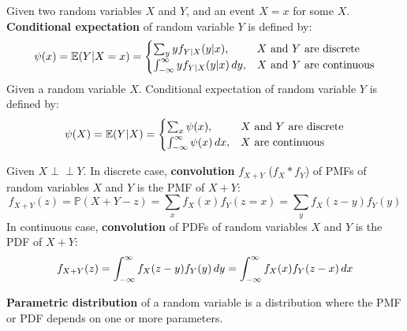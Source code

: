 \documentclass{huhtakm-template-book}
\newcommand{\independent}{\perp\!\!\!\perp}
\newcommand{\prob}{\mathbb{P}}
\newcommand{\expect}{\mathbb{E}}
\begin{document}
\begin{sdefn}
	Given two random variables $X$ and $Y$, and an event $X=x$ for some $X$. \textbf{Conditional expectation} of random variable $Y$ is defined by:
	\begin{equation*}
		\psi(x)=\expect(Y|X=x)=\begin{cases}
			\sum_{y}yf_{Y|X}(y|x), &X\text{ and }Y\text{ are discrete}\\
			\intinfty yf_{Y|X}(y|x)\,dy, &X\text{ and }Y\text{ are continuous}
		\end{cases}
	\end{equation*}
	Given a random variable $X$. Conditional expectation of random variable $Y$ is defined by:
	\begin{equation*}
		\psi(X)=\expect(Y|X)=\begin{cases}
			\sum_{x}\psi(x), &X\text{ and }Y\text{ are discrete}\\
			\intinfty\psi(x)\,dx, &X\text{ are continuous}
		\end{cases}
	\end{equation*}
\end{sdefn}
\begin{sdefn}
	Given $X\independent Y$. In discrete case, \textbf{convolution} $f_{X+Y}$ ($f_{X}*f_{Y}$) of PMFs of random variables $X$ and $Y$ is the PMF of $X+Y$:
	\begin{equation*}
		f_{X+Y}(z)=\prob(X+Y-z)=\sum_{x}f_{X}(x)f_{Y}(z=x)=\sum_{y}f_{X}(z-y)f_{Y}(y)
	\end{equation*}
	In continuous case, \textbf{convolution} of PDFs of random variables $X$ and $Y$ is the PDF of $X+Y$:
	\begin{equation*}
		f_{X+Y}(z)=\int_{-\infty}^{\infty} f_{X}(z-y)f_{Y}(y)\,dy=\int_{-\infty}^{\infty} f_{X}(x)f_{Y}(z-x)\,dx
	\end{equation*}
\end{sdefn}
\begin{sdefn}
	\textbf{Parametric distribution} of a random variable is a distribution where the PMF or PDF depends on one or more parameters.
\end{sdefn}

\newpage
\end{document}
